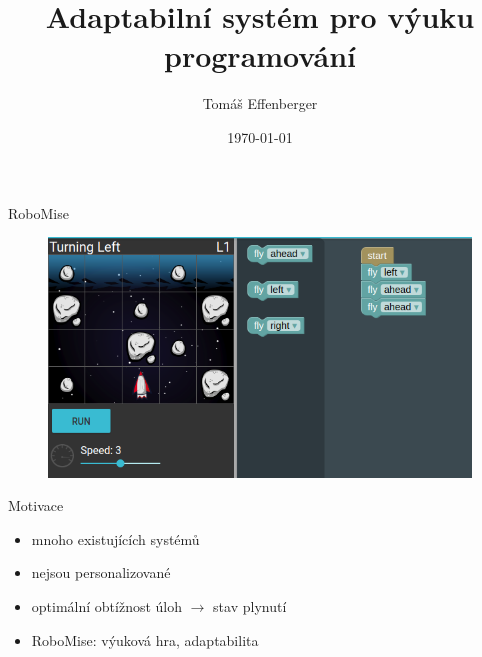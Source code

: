 \documentclass[
]{beamer}
\begin{document}
\title{Adaptabilní systém pro výuku programování}
\author[T.\,Effenberger]{Tomáš Effenberger} %
\date{\today}

\begin{frame}[plain]
\maketitle
\end{frame}



\begin{frame}{RoboMise}
\begin{figure}
\includegraphics[width=\textwidth,height=.65\textheight,keepaspectratio]{../img/robomission-task1}
\end{figure}
\end{frame}

\begin{frame}{Motivace}
\begin{itemize}
\item mnoho existujících systémů
\item nejsou personalizované
\item optimální obtížnost úloh $\rightarrow$ stav plynutí
\item RoboMise: výuková hra, adaptabilita
\end{itemize}
\end{frame}
\end{document}
